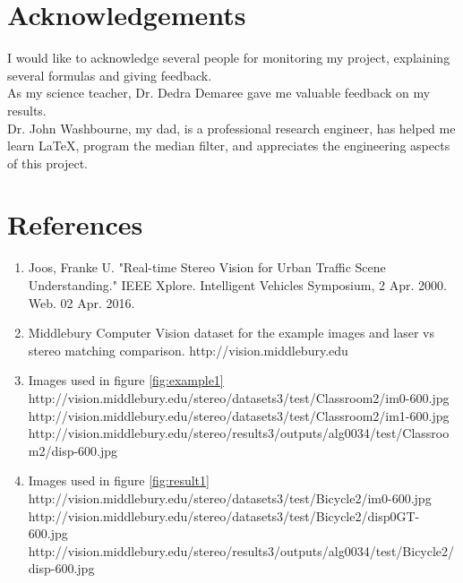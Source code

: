 \documentclass[11pt,fleqn]{article}
\begin{document}
\section{Acknowledgements}

I would like to acknowledge several people for monitoring my project, explaining several formulas and giving feedback.\\[5pt]
%
As my science teacher, Dr. Dedra Demaree gave me valuable feedback on my results.\\[5pt]
%
Dr. John Washbourne, my dad, is a professional research engineer, has helped me learn LaTeX, program the median filter, and appreciates the engineering aspects of this project.


\section{References}

\begin{enumerate}
\item Joos, Franke U. "Real-time Stereo Vision for Urban Traffic Scene Understanding." IEEE Xplore. Intelligent Vehicles Symposium, 2 Apr. 2000. Web. 02 Apr. 2016.
\item Middlebury Computer Vision dataset for the example images and laser vs stereo matching comparison.  
\small
http://vision.middlebury.edu
\normalsize

\item Images used in figure \ref{fig:example1}\\  
\small
http://vision.middlebury.edu/stereo/datasets3/test/Classroom2/im0-600.jpg\\
http://vision.middlebury.edu/stereo/datasets3/test/Classroom2/im1-600.jpg\\
http://vision.middlebury.edu/stereo/results3/outputs/alg0034/test/Classroom2/disp-600.jpg
\normalsize

\item Images used in figure \ref{fig:result1}\\  
\small
http://vision.middlebury.edu/stereo/datasets3/test/Bicycle2/im0-600.jpg\\
http://vision.middlebury.edu/stereo/datasets3/test/Bicycle2/disp0GT-600.jpg\\
http://vision.middlebury.edu/stereo/results3/outputs/alg0034/test/Bicycle2/disp-600.jpg
\normalsize
\end{enumerate}
\end{document}
